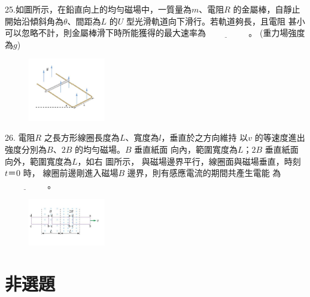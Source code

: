\documentclass[cn,10pt,math=newtx]{elegantbook}
\begin{document}
\begin{example}
   25.如圖所示，在鉛直向上的均勻磁場中，一質量為$m$、電阻$R$ 的金屬棒，自靜止
開始沿傾斜角為$\theta$、間距為$L$ 的$U$ 型光滑軌道向下滑行。若軌道夠長，且電阻
甚小可以忽略不計，則金屬棒滑下時所能獲得的最大速率為$\underline{\hspace{2cm}}$ 。
(重力場強度為$g$)\\
    \rightline{[中壢高中教甄109]}
\end{example}
\begin{solution}
    
\end{solution}
\begin{figure}[htbp]
    \flushright
    \includegraphics[width=0.3\textwidth]{image/109中壢25.png}
  \end{figure}
\newpage

\begin{example}
   26. 電阻$R$ 之長方形線圈長度為$L$、寬度為$l$，垂直於之方向維持
以$v$ 的等速度進出強度分別為$B$、$2B$ 的均勻磁場。$B$ 垂直紙面
向內，範圍寬度為$L$；$2B$ 垂直紙面向外，範圍寬度為$L$，如右
圖所示， 與磁場邊界平行，線圈面與磁場垂直，時刻$t ＝ $0 時，
線圈前邊剛進入磁場$B$ 邊界，則有感應電流的期間共產生電能
為$\underline{\hspace{2cm}}$ 。\\
    \rightline{[中壢高中教甄109]}
\end{example}
\begin{solution}
    
\end{solution}
\begin{figure}[htbp]
    \flushright
    \includegraphics[width=0.3\textwidth]{image/109中壢26.png}
  \end{figure}
\newpage

\section{非選題}
\end{document}
